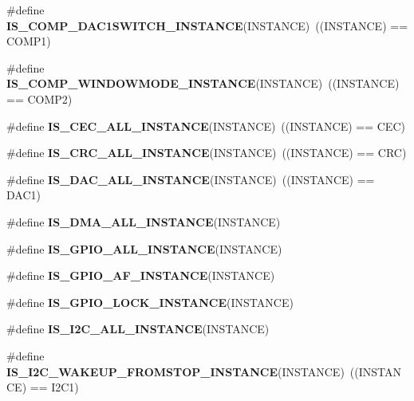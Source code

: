 \begin{DoxyCompactItemize}
\#define {\bfseries I\+S\+\_\+\+C\+O\+M\+P\+\_\+\+D\+A\+C1\+S\+W\+I\+T\+C\+H\+\_\+\+I\+N\+S\+T\+A\+N\+CE}(I\+N\+S\+T\+A\+N\+CE)~((I\+N\+S\+T\+A\+N\+CE) == C\+O\+M\+P1)
\item 
\mbox{\label{group___exported__macro_gab7f78e841f84bf7ec834748ca685fbc0}} 
\#define {\bfseries I\+S\+\_\+\+C\+O\+M\+P\+\_\+\+W\+I\+N\+D\+O\+W\+M\+O\+D\+E\+\_\+\+I\+N\+S\+T\+A\+N\+CE}(I\+N\+S\+T\+A\+N\+CE)~((I\+N\+S\+T\+A\+N\+CE) == C\+O\+M\+P2)
\item 
\mbox{\label{group___exported__macro_ga10cad35fdea5ffcb9f17973ce98c7dee}} 
\#define {\bfseries I\+S\+\_\+\+C\+E\+C\+\_\+\+A\+L\+L\+\_\+\+I\+N\+S\+T\+A\+N\+CE}(I\+N\+S\+T\+A\+N\+CE)~((I\+N\+S\+T\+A\+N\+CE) == C\+EC)
\item 
\mbox{\label{group___exported__macro_gaa514941a7f02f65eb27450c05e4e8dd1}} 
\#define {\bfseries I\+S\+\_\+\+C\+R\+C\+\_\+\+A\+L\+L\+\_\+\+I\+N\+S\+T\+A\+N\+CE}(I\+N\+S\+T\+A\+N\+CE)~((I\+N\+S\+T\+A\+N\+CE) == C\+RC)
\item 
\mbox{\label{group___exported__macro_ga94426b97cc5f1644d67f291cbcdba6d8}} 
\#define {\bfseries I\+S\+\_\+\+D\+A\+C\+\_\+\+A\+L\+L\+\_\+\+I\+N\+S\+T\+A\+N\+CE}(I\+N\+S\+T\+A\+N\+CE)~((I\+N\+S\+T\+A\+N\+CE) == D\+A\+C1)
\item 
\#define {\bfseries I\+S\+\_\+\+D\+M\+A\+\_\+\+A\+L\+L\+\_\+\+I\+N\+S\+T\+A\+N\+CE}(I\+N\+S\+T\+A\+N\+CE)
\item 
\#define {\bfseries I\+S\+\_\+\+G\+P\+I\+O\+\_\+\+A\+L\+L\+\_\+\+I\+N\+S\+T\+A\+N\+CE}(I\+N\+S\+T\+A\+N\+CE)
\item 
\#define {\bfseries I\+S\+\_\+\+G\+P\+I\+O\+\_\+\+A\+F\+\_\+\+I\+N\+S\+T\+A\+N\+CE}(I\+N\+S\+T\+A\+N\+CE)
\item 
\#define {\bfseries I\+S\+\_\+\+G\+P\+I\+O\+\_\+\+L\+O\+C\+K\+\_\+\+I\+N\+S\+T\+A\+N\+CE}(I\+N\+S\+T\+A\+N\+CE)
\item 
\#define {\bfseries I\+S\+\_\+\+I2\+C\+\_\+\+A\+L\+L\+\_\+\+I\+N\+S\+T\+A\+N\+CE}(I\+N\+S\+T\+A\+N\+CE)
\item 
\mbox{\label{group___exported__macro_gadf692bda16bac3264bccff7f59ddaab9}} 
\#define {\bfseries I\+S\+\_\+\+I2\+C\+\_\+\+W\+A\+K\+E\+U\+P\+\_\+\+F\+R\+O\+M\+S\+T\+O\+P\+\_\+\+I\+N\+S\+T\+A\+N\+CE}(I\+N\+S\+T\+A\+N\+CE)~((I\+N\+S\+T\+A\+N\+CE) == I2\+C1)

\end{DoxyCompactItemize}

